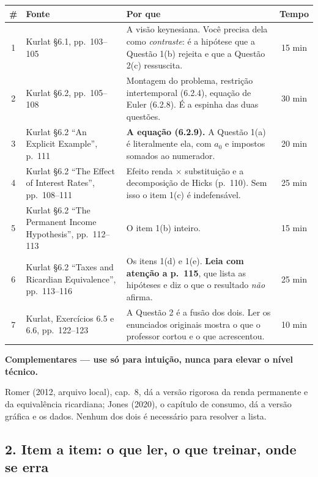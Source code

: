 \documentclass[11pt, a4paper]{article}
\newcommand{\passo}[1]{\medskip\noindent\textbf{#1}\par\nobreak}
\begin{document}
\begin{center}
\small
\begin{tabular}{clp{7.6cm}c}
\toprule
\textbf{\#} & \textbf{Fonte} & \textbf{Por que} & \textbf{Tempo} \\
\midrule
1 & Kurlat §6.1, pp.\ 103--105
  & A visão keynesiana. Você precisa dela como \emph{contraste}: é a hipótese que a
    Questão 1(b) rejeita e que a Questão 2(c) ressuscita. & 15 min \\
2 & Kurlat §6.2, pp.\ 105--108
  & Montagem do problema, restrição intertemporal (6.2.4), equação de Euler (6.2.8).
    É a espinha das duas questões. & 30 min \\
3 & Kurlat §6.2 ``An Explicit Example'', p.\ 111
  & \textbf{A equação (6.2.9).} A Questão 1(a) é literalmente ela, com $a_0$ e impostos
    somados ao numerador. & 20 min \\
4 & Kurlat §6.2 ``The Effect of Interest Rates'', pp.\ 108--111
  & Efeito renda $\times$ substituição e a decomposição de Hicks (p.\ 110). Sem isso o
    item 1(c) é indefensável. & 25 min \\
5 & Kurlat §6.2 ``The Permanent Income Hypothesis'', pp.\ 112--113
  & O item 1(b) inteiro. & 15 min \\
6 & Kurlat §6.2 ``Taxes and Ricardian Equivalence'', pp.\ 113--116
  & Os itens 1(d) e 1(e). \textbf{Leia com atenção a p.\ 115}, que lista as hipóteses e
    diz o que o resultado \emph{não} afirma. & 25 min \\
7 & Kurlat, Exercícios 6.5 e 6.6, pp.\ 122--123
  & A Questão 2 é a fusão dos dois. Ler os enunciados originais mostra o que o professor
    cortou e o que acrescentou. & 10 min \\
\bottomrule
\end{tabular}
\end{center}

\passo{Complementares --- use só para intuição, nunca para elevar o nível técnico.}
Romer (2012, arquivo local), cap.\ 8, dá a versão rigorosa da renda permanente e da
equivalência ricardiana; Jones (2020), o capítulo de consumo, dá a versão gráfica e os
dados. Nenhum dos dois é necessário para resolver a lista.

\subsection*{2. Item a item: o que ler, o que treinar, onde se erra}
\end{document}
